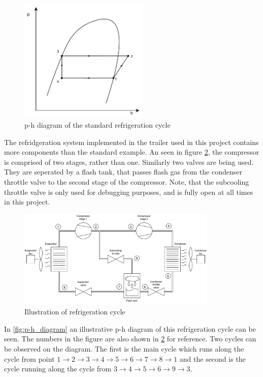 \begin{figure}[h!]
	\centering
	\includegraphics[width=0.55\textwidth]{Graphics/p-h_diagram_std}
	\caption{p-h diagram of the standard refrigeration cycle}
	\label{fig:p-h_diagram_std}
\end{figure}


The refridgeration system implemented in the trailer used in this project contains more components than the standard example. An seen in figure \cref{fig:HVAC_Diagram}, the compressor is comprised of two stages, rather than one. Similarly two valves are being used. They are seperated by a flash tank, that passes flash gas from the condenser throttle valve to the second stage of the compressor. Note, that the subcooling throttle valve is only used for debugging purposes, and is fully open at all times in this project.

\begin{figure}[h!]
	\centering
	\includegraphics[width=0.85\textwidth]{Graphics/HVAC_Diagram_Fans.pdf}
	\caption{Illustration of refrigeration cycle}
	\label{fig:HVAC_Diagram}
\end{figure}

In \cref{fig:p-h_diagram} an illustrative p-h diagram of this refrigeration cycle can be seen.  The numbers in the figure are also shown in \cref{fig:HVAC_Diagram} for reference. Two cycles can be observed on the diagram. The first is the main cycle which runs along the cycle from point $1 \rightarrow 2\rightarrow 3 \rightarrow 4 \rightarrow 5 \rightarrow 6 \rightarrow 7 \rightarrow 8 \rightarrow 1$ and the second is the cycle running along the cycle from $3 \rightarrow 4 \rightarrow 5 \rightarrow 6 \rightarrow 9 \rightarrow 3$. \\


